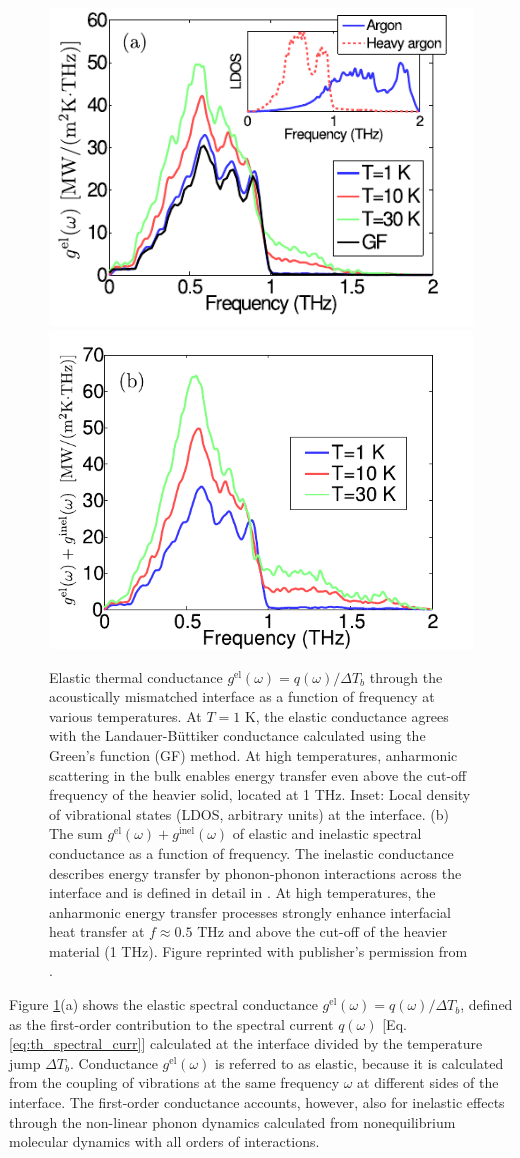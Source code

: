 \begin{figure}[tb]
 \begin{center}
  \includegraphics[width=.49\columnwidth]{pics/nemd_fig4a.pdf}
  \includegraphics[width=.49\columnwidth]{pics/nemd_fig4b.pdf}
  \caption{Elastic thermal conductance $g^{\textrm{el}}(\omega)=q(\omega)/\Delta T_b$ through the acoustically mismatched interface as a function of frequency at various temperatures.  At $T=1$ K, the elastic conductance agrees with the Landauer-B\"uttiker conductance calculated using the Green's function (GF) method. At high temperatures, anharmonic scattering in the bulk enables energy transfer even above the cut-off frequency of the heavier solid, located at 1 THz.  Inset: Local density of vibrational states (LDOS, arbitrary units) at the interface. (b) The sum $g^{\textrm{el}}(\omega)+ g^{\textrm{inel}}(\omega)$ of elastic and inelastic spectral conductance as a function of frequency. The inelastic conductance describes energy transfer by phonon-phonon interactions across the interface and is defined in detail in . At high temperatures, the anharmonic energy transfer processes strongly enhance interfacial heat transfer at $f\approx 0.5$ THz and above the cut-off of the heavier material (1 THz). Figure reprinted with publisher's permission from .} 
 \label{fig:nemd_fig2}
 \end{center}
\end{figure}

Figure \ref{fig:nemd_fig2}(a) shows the elastic spectral conductance $g^{\textrm{el}}(\omega)=q(\omega)/\Delta T_b$, defined as the first-order contribution to the spectral current $q(\omega)$ [Eq. \eqref{eq:th_spectral_curr}] calculated at the interface divided by the temperature jump $\Delta T_b$. Conductance $g^{\textrm{el}}(\omega)$ is referred to as elastic, because it is calculated from the coupling of vibrations at the same frequency $\omega$ at different sides of the interface. The first-order conductance accounts, however, also for inelastic effects through the non-linear phonon dynamics calculated from nonequilibrium molecular dynamics with all orders of interactions. 

